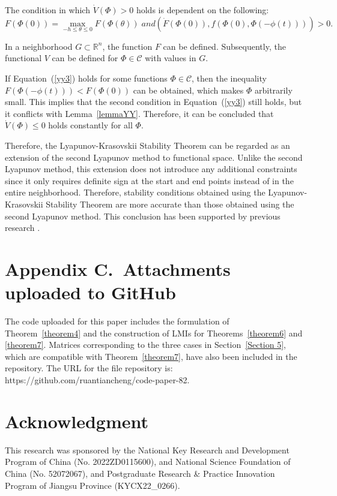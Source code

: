 \documentclass[a4paper]{cas-sc}
\begin{document}
The condition in which $\dot{V}\left(\Phi\right)>0$ holds is dependent on the following:
\begin{equation}
  F(\Phi (0)) = \mathop {\max }\limits_{ - h \le \theta  \le 0} F(\Phi (\theta ))\;and(\dot F(\Phi (0)),f(\Phi(0), \Phi(-\phi(t)))) > 0.
  \label{yy3}
\end{equation}

In a neighborhood $G\subset\mathbb{R}^n$, the function $F$ can be defined. Subsequently, the functional $V$ can be defined for $\Phi\in\mathcal{C}$ with values in $G$.


If Equation~(\ref{yy3}) holds for some functions $\Phi\in\mathcal{C}$, then the inequality $F\left(\Phi\left(-\phi\left(t\right)\right)\right)<F\left(\Phi\left(0\right)\right)$ can be obtained, which makes $\Phi$ arbitrarily small. This implies that the second condition in Equation~(\ref{yy3}) still holds, but it conflicts with Lemma~\ref{lemmaYY}. Therefore, it can be concluded that $\dot{V}\left(\Phi\right)\le0$ holds constantly for all $\Phi$.


Therefore, the Lyapunov-Krasovskii Stability Theorem can be regarded as an extension of the second Lyapunov method to functional space. Unlike the second Lyapunov method, this extension does not introduce any additional constraints since it only requires definite sign at the start and end points instead of in the entire neighborhood. Therefore, stability conditions obtained using the Lyapunov-Krasovskii Stability Theorem are more accurate than those obtained using the second Lyapunov method. This conclusion has been supported by previous research \citep{wang2016fuzzy,lian2020dissipativity}.





\section*{Appendix C.~Attachments uploaded to GitHub}
\label{AppendixB}
The code uploaded for this paper includes the formulation of Theorem~\ref{theorem4} and the construction of LMIs for Theorems~\ref{theorem6} and \ref{theorem7}. Matrices corresponding to the three cases in Section~\ref{Section 5}, which are compatible with Theorem~\ref{theorem7}, have also been included in the repository. The URL for the file repository is:\\ 
https://github.com/ruantiancheng/code-paper-82.

\printcredits

\section*{Acknowledgment}

This research was sponsored by the National Key Research and Development Program of China (No. 2022ZD0115600), and National Science Foundation of China (No. 52072067), and Postgraduate Research \& Practice Innovation Program of Jiangsu Province (KYCX22\_0266).

% 





\end{document}
